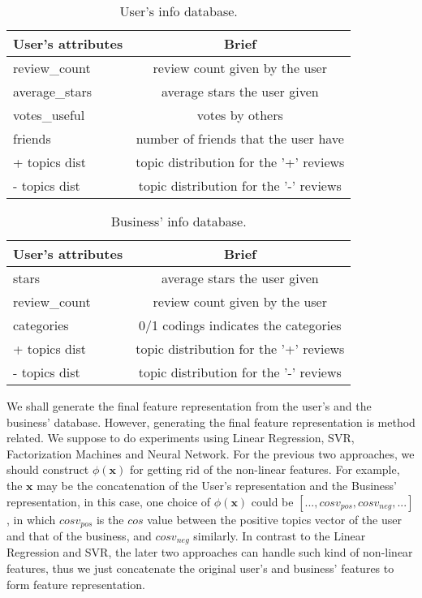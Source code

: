 \documentclass[10pt,twocolumn,letterpaper]{article}
\begin{document}
\begin{table}[h!]
\label{table:userdb}
\begin{center}
\begin{tabular}{|l|c|}
\hline
User's attributes & Brief\\
\hline\hline
review\_count & review count given by the user \\
average\_stars & average stars the user given \\
votes\_useful & votes by others \\
friends & number of friends that the user have \\
+ topics dist & topic distribution for the '+' reviews \\
- topics dist & topic distribution for the '-' reviews \\
\hline
\end{tabular}
\end{center}
\caption{User's info database.}
\end{table}

\begin{table}[h!]
\label{table:businessdb}
\begin{center}
\begin{tabular}{|l|c|}
\hline
User's attributes & Brief\\
\hline\hline
stars & average stars the user given \\
review\_count & review count given by the user \\
categories & 0/1 codings indicates the categories\\
+ topics dist & topic distribution for the '+' reviews \\
- topics dist & topic distribution for the '-' reviews \\
\hline
\end{tabular}
\end{center}
\caption{Business' info database.}
\end{table}

We shall generate the final feature representation from the user’s and the business’ database. However, generating the final feature representation is method related. We suppose to do experiments using Linear Regression, SVR, Factorization Machines and Neural Network. For the previous two approaches, we should construct $\phi(\mathbf{x})$ for getting rid of the non-linear features. For example, the $\mathbf{x}$ may be the concatenation of the User’s representation and the Business’ representation, in this case, one choice of $\phi(\mathbf{x})$ could be $[...,cosv_{pos},cosv_{neg},...]$, in which $cosv_{pos}$ is the $cos$ value between the positive topics vector of the user and that of the business, and $cosv_{neg}$ similarly.  In contrast to the Linear Regression and SVR, the later two approaches can handle such kind of non-linear features, thus we just concatenate the original user’s and business’ features to form feature representation.
\end{document}
